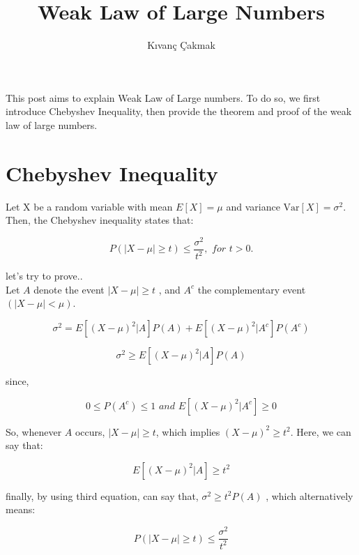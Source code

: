\documentclass[11pt]{article}
\title{\textbf{Weak Law of Large Numbers}}
\author{K{\i}van\c{c} \c{C}akmak\\}
\date{}
\begin{document}
\maketitle

This post aims to explain Weak Law of Large numbers. To do so, we first introduce Chebyshev Inequality, then provide the theorem and proof of the weak law of large numbers. 

\section{Chebyshev Inequality}

Let X be a random variable with mean $E[X] = \mu$ and variance $\mathrm{Var}[X] = \sigma^2$.  Then, the Chebyshev inequality states that:

\begin{equation}
 P(|X - \mu| \geq t) \leq \frac{\sigma^2}{t^2} , \textit{ for } t > 0 .
\end{equation} 

let's try to prove.. \\

Let $A$ denote the event $|X - \mu| \geq t$ , and $A^{c}$ the complementary event $(|X - \mu| < \mu )$.

\begin{equation}
\sigma^2 = E[(X - \mu)^2|A]P(A) + E[(X - \mu)^2|A^{c}]P(A^{c}) 
\end{equation}

\begin{equation}
\sigma^2 \geq E[(X - \mu)^2|A]P(A) 
\end{equation}

since,

\begin{equation}
0 \leq P(A^{c}) \leq 1 \textit{ and } E[(X - \mu)^2|A^{c}] \geq 0
\end{equation}

So, whenever $A$ occurs, $|X - \mu| \geq t$, which implies $(X - \mu)^{2} \geq t^{2}$. Here, we can say that: 

\begin{equation}
E[(X - \mu)^2 | A] \geq t^{2} 
\end{equation}

finally, by using third equation, can say that, $\sigma^2 \geq t^2 P(A)$ , which alternatively means: 

\begin{equation}
P(|X - \mu| \geq t) \leq \frac{\sigma^2}{t^2} 
\end{equation}
\end{document}
